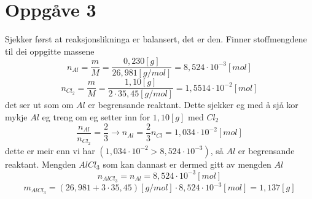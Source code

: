 \documentclass[12pt,a4paper]{article}
\begin{document}
  \section*{Oppgåve 3}
    Sjekker først at reaksjonslikninga er balansert, det er den. Finner stoffmengdene til
    dei oppgitte massene
    \begin{equation}
      n_{Al} = \frac{m}{M} = \frac{0,230[g]}{26,981[g/mol]} = 8,524\cdot10^{-3}[mol]
    \end{equation}
    \begin{equation}
      n_{Cl_2} = \frac{m}{M} = \frac{1,10[g]}{2\cdot 35,45[g/mol]} = 1,5514\cdot 10^{-2}[mol]
    \end{equation}
    det ser ut som om $Al$ er begrensande reaktant. Dette sjekker eg med å sjå kor mykje
    $Al$ eg treng om eg setter inn for $1,10[g]$ med $Cl_2$
    \begin{equation}
      \frac{n_{Al}}{n_{Cl_2}} = \frac{2}{3} \rightarrow n_{Al} = \frac{2}{3}n_{Cl} =
      1,034\cdot 10^{-2}[mol]
    \end{equation}
    dette er meir enn vi har $\left( 1,034\cdot 10^{-2} > 8,524\cdot 10^{-3} \right)$, så $Al$ er
    begrensande reaktant. Mengden $AlCl_3$ som kan dannast er dermed gitt av mengden $Al$
    \begin{equation}
      n_{AlCl_3} = n_{Al} = 8,524\cdot 10^{-3}[mol]
    \end{equation}
    \begin{equation}
      m_{AlCl_3} = \left( 26,981 + 3 \cdot 35,45 \right) [g/mol] \cdot 8,524\cdot10^{-3}
      [mol] = 1,137[g]
    \end{equation}


  \newpage
\end{document}

